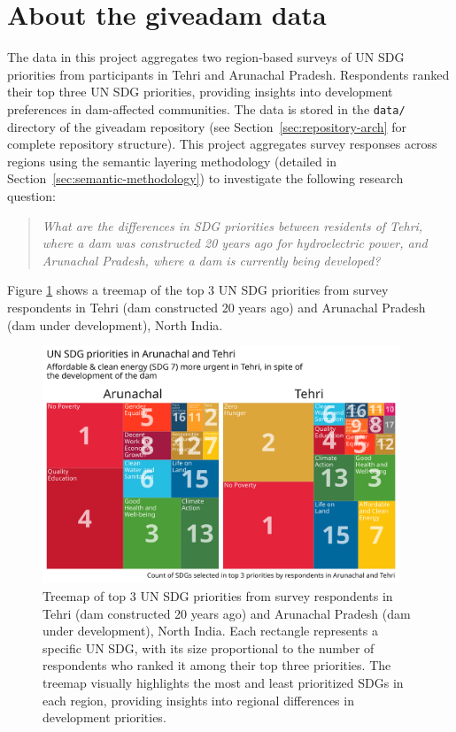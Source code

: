 \documentclass{article}
\begin{document}
\section{About the giveadam data}
\label{sec:aboutdata}

The data in this project aggregates two region-based surveys of UN SDG priorities from participants in Tehri and Arunachal Pradesh. Respondents ranked their top three UN SDG priorities, providing insights into development preferences in dam-affected communities. The data is stored in the \texttt{data/} directory of the giveadam repository (see Section~\ref{sec:repository-arch} for complete repository structure). This project aggregates survey responses across regions using the semantic layering methodology (detailed in Section~\ref{sec:semantic-methodology}) to investigate the following research question:

\begin{quote}
  \textit{What are the differences in SDG priorities between residents of Tehri, where a dam was constructed 20 years ago for hydroelectric power, and Arunachal Pradesh, where a dam is currently being developed?}
\end{quote}

Figure \ref{fig:top3-treemap} shows a treemap of the top 3 UN SDG priorities from survey respondents in Tehri (dam constructed 20 years ago) and Arunachal Pradesh (dam under development), North India.

\begin{figure}[ht]
  \centering
  \includegraphics[width=0.95\textwidth]{../figures_and_tables/top3-treemap.png}
  \caption{\label{fig:top3-treemap} Treemap of top 3 UN SDG priorities from survey respondents in Tehri (dam constructed 20 years ago) and Arunachal Pradesh (dam under development), North India. Each rectangle represents a specific UN SDG, with its size proportional to the number of respondents who ranked it among their top three priorities. The treemap visually highlights the most and least prioritized SDGs in each region, providing insights into regional differences in development priorities.}
\end{figure}
\end{document}
